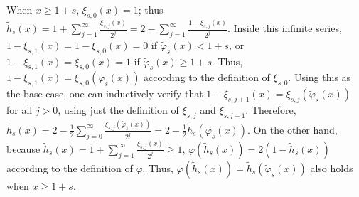 When $x\ge1+s$, $\xi_{s,0}(x)=1$; thus
$\tilde{h}_s(x) = 1+ \sum_{j=1}^{\infty} \frac{\xi_{s,j}(x)}{2^j}
                = 2- \sum_{j=1}^{\infty} \frac{1-\xi_{s,j}(x)}{2^j}$.
Inside this infinite series, $1-\xi_{s,1}(x)=1-\xi_{s,0}(x)=0$ if $\tilde\varphi_s(x)<1+s$,
or $1-\xi_{s,1}(x)=\xi_{s,0}(x)=1$ if $\tilde\varphi_s(x)\ge 1+s$.
Thus, $1-\xi_{s,1}(x) = \xi_{s,0}(\varphi_s(x))$ according to the definition of $\xi_{s,0}$.
Using this as the base case, one can inductively verify that
$1-\xi_{s,j+1}(x) = \xi_{s,j}(\tilde\varphi_s(x))$
for all $j>0$, using just the definition of $\xi_{s,j}$ and $\xi_{s,j+1}$.
Therefore,
$\tilde{h}_s(x) = 2 - \frac12 \sum_{j=0}^{\infty} \frac{\xi_{s,j}(\tilde\varphi_s(x))}{2^j}
=2 - \frac12 \tilde{h}_s(\tilde\varphi_s(x))$.
On the other hand, because
$\tilde{h}_s(x) = 1+\sum_{j=1}^{\infty} \frac{\xi_{s,j}(x)}{2^j}\ge 1$,
$\varphi(\tilde{h}_s(x)) = 2(1-\tilde{h}_s(x))$ according
to the definition of $\varphi$.  Thus,
$\varphi(\tilde{h}_s(x)) = \tilde{h}_s(\tilde\varphi_s(x))$ also holds when $x\ge 1+s$.

